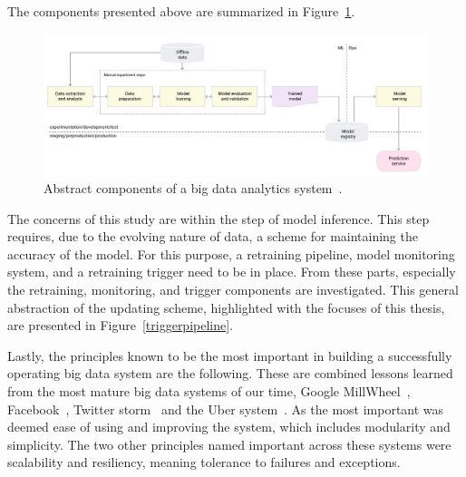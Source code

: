 The components presented above are summarized in Figure~\ref{simplepipeline}.

\begin{figure}[hb]
\newline
\begin{center}
\includegraphics[width=1.0\columnwidth]{simplegoogle.png}
\caption{Abstract components of a big data analytics system~\cite{googlemlops}.}
\label{simplepipeline}
\end{center}
\end{figure}

The concerns of this study are within the step of model inference. This step requires, due to the evolving nature of data, a scheme for maintaining the accuracy of the model. For this purpose, a retraining pipeline, model monitoring system, and a retraining trigger need to be in place. From these parts, especially the retraining, monitoring, and trigger components are investigated. This general abstraction of the updating scheme, highlighted with the focuses of this thesis, are presented in Figure~\ref{triggerpipeline}.

Lastly, the principles known to be the most important in building a successfully operating big data system are the following. These are combined lessons learned from the most mature big data systems of our time, Google MillWheel~\cite{millwheel}, Facebook~\cite{facebook}, Twitter storm~\cite{storm@twitter} and the Uber system~\cite{uber}. As the most important was deemed ease of using and improving the system, which includes modularity and simplicity. The two other principles named important across these systems were scalability and resiliency, meaning tolerance to failures and exceptions. 

